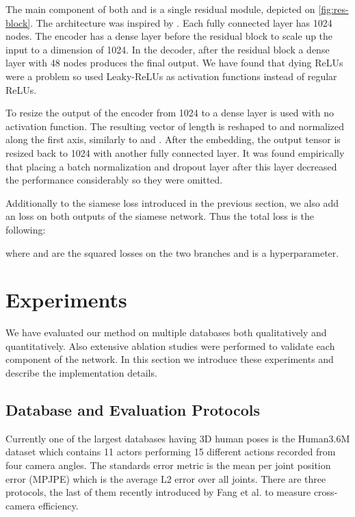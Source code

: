 \documentclass[preprint]{elsarticle}
\begin{document}
The main component of both  and  is a single residual module, depicted on \autoref{fig:res-block}. The architecture was inspired by \cite{3dbaseline}. Each fully connected layer has 1024 nodes. The encoder  has a dense layer before the residual block to scale up the input to a dimension of 1024. In the decoder, after the residual block a dense layer with 48 nodes produces the final output. We have found that dying ReLUs were a problem so used Leaky-ReLUs as activation functions instead of regular ReLUs. 

To resize the output of the encoder from 1024 to  a dense layer is used with no activation function. The resulting vector of length  is reshaped to  and normalized along the first axis, similarly to \cite{facenet} and \cite{amazon_siamese-sampling}. After the embedding, the output tensor is resized back to 1024 with another fully connected layer. It was found empirically that placing a batch normalization and dropout layer after this layer decreased the performance considerably so they were omitted.

Additionally to the siamese loss introduced in the previous section, we also add an  loss on both outputs of the siamese network. Thus the total loss is the following:

where  and  are the squared  losses on the two branches and  is a hyperparameter.

\section{Experiments}
We have evaluated our method on multiple databases both qualitatively and quantitatively. Also extensive ablation studies were performed to validate each component of the network.  In this section we introduce these experiments and describe the implementation details.

\subsection{Database and Evaluation Protocols}
Currently one of the largest databases having 3D human poses is the Human3.6M dataset which contains 11 actors performing 15 different actions re\-cor\-ded from four camera angles. The standards error metric is the mean per joint position error (MPJPE) which is the average L2 error over all joints. There are three protocols, the last of them recently introduced by Fang et al. \cite{fang2018posegrammar} to measure cross-camera efficiency.
\end{document}
